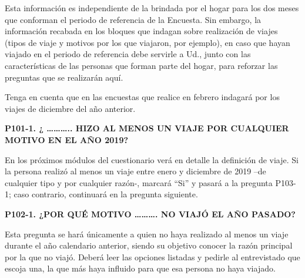 \documentclass[
  openany]{book}
\begin{document}
Esta información es independiente de la brindada por el hogar para los dos meses que conforman el periodo de referencia de la Encuesta. Sin embargo, la información recabada en los bloques que indagan sobre realización de viajes (tipos de viaje y motivos por los que viajaron, por ejemplo), en caso que hayan viajado en el periodo de referencia debe servirle a Ud., junto con las características de las personas que forman parte del hogar, para reforzar las preguntas que se realizarán aquí.

Tenga en cuenta que en las encuestas que realice en febrero indagará por los viajes de diciembre del año anterior.

\textbf{P101-1. ¿ \ldots\ldots\ldots.. HIZO AL MENOS UN VIAJE POR CUALQUIER MOTIVO EN EL AÑO 2019?}

En los próximos módulos del cuestionario verá en detalle la definición de viaje. Si la persona realizó al menos un viaje entre enero y diciembre de 2019 --de cualquier tipo y por cualquier razón-, marcará ``Si'' y pasará a la pregunta P103-1; caso contrario, continuará en la pregunta siguiente.

\textbf{P102-1. ¿POR QUÉ MOTIVO \ldots\ldots\ldots. NO VIAJÓ EL AÑO PASADO?}

Esta pregunta se hará únicamente a quien no haya realizado al menos un viaje durante el año calendario anterior, siendo su objetivo conocer la razón principal por la que no viajó. Deberá leer las opciones listadas y pedirle al entrevistado que escoja una, la que más haya influido para que esa persona no haya viajado.
\end{document}

